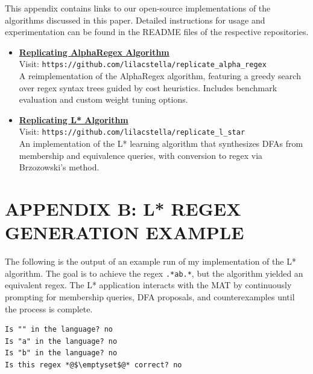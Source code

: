 \indent\indent This appendix contains links to our open-source implementations of the algorithms discussed in this paper. Detailed instructions for usage and experimentation can be found in the README files of the respective repositories.

\begin{itemize}
	\item \href{https://github.com/lilacstella/replicate\_alpha\_regex}{\textbf{Replicating AlphaRegex Algorithm}} \\
	Visit: \texttt{https://github.com/lilacstella/replicate\_alpha\_regex} \\
	A reimplementation of the AlphaRegex algorithm, featuring a greedy search over regex syntax trees guided by cost heuristics. Includes benchmark evaluation and custom weight tuning options.
	
	\item \href{https://github.com/lilacstella/replicate\_l\_star}{\textbf{Replicating L* Algorithm}} \\
	Visit: \texttt{https://github.com/lilacstella/replicate\_l\_star} \\
	An implementation of the L* learning algorithm that synthesizes DFAs from membership and equivalence queries, with conversion to regex via Brzozowski's method.
\end{itemize}



\chapter*{\large\bf APPENDIX B: L* REGEX GENERATION EXAMPLE}



\renewcommand{\thefigure}{B.\arabic{figure}}
\setcounter{figure}{0}

\indent\indent The following is the output of an example run of my implementation of the L* algorithm. The goal is to achieve the regex \texttt{.*ab.*}, but the algorithm yielded an equivalent regex. The L* application interacts with the MAT by continuously prompting for membership queries, DFA proposals, and counterexamples until the process is complete.

\begin{lstlisting}
Is "" in the language? no
Is "a" in the language? no
Is "b" in the language? no
Is this regex *@$\emptyset$@* correct? no
\end{lstlisting}

